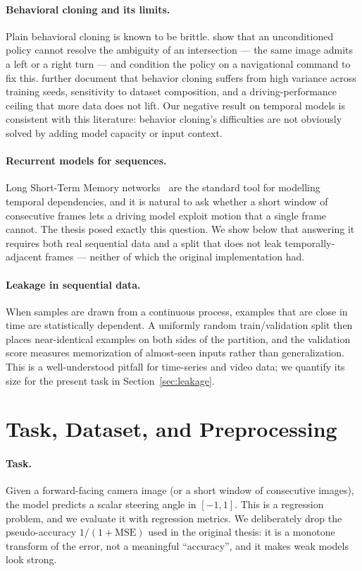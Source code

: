 \documentclass[11pt]{article}
\begin{document}
\paragraph{Behavioral cloning and its limits.}
Plain behavioral cloning is known to be brittle. \mbox{\citet{codevilla2018end}} show that
an unconditioned policy cannot resolve the ambiguity of an intersection --- the same
image admits a left or a right turn --- and condition the policy on a navigational
command to fix this. \mbox{\citet{codevilla2019exploring}} further document that behavior
cloning suffers from high variance across training seeds, sensitivity to dataset
composition, and a driving-performance ceiling that more data does not lift. Our
negative result on temporal models is consistent with this literature: behavior
cloning's difficulties are not obviously solved by adding model capacity or input
context.

\paragraph{Recurrent models for sequences.}
Long Short-Term Memory networks~\mbox{\citep{hochreiter1997long}} are the standard tool for
modelling temporal dependencies, and it is natural to ask whether a short window of
consecutive frames lets a driving model exploit motion that a single frame cannot.
The thesis posed exactly this question. We show below that answering it requires
both real sequential data and a split that does not leak temporally-adjacent frames
--- neither of which the original implementation had.

\paragraph{Leakage in sequential data.}
When samples are drawn from a continuous process, examples that are close in time
are statistically dependent. A uniformly random train/validation split then places
near-identical examples on both sides of the partition, and the validation score
measures memorization of almost-seen inputs rather than generalization. This is a
well-understood pitfall for time-series and video data; we quantify its size for the
present task in Section~\ref{sec:leakage}.

\section{Task, Dataset, and Preprocessing}

\paragraph{Task.}
Given a forward-facing camera image (or a short window of consecutive images), the
model predicts a scalar steering angle in $[-1, 1]$. This is a regression problem,
and we evaluate it with regression metrics. We deliberately drop the pseudo-accuracy
$1/(1+\mathrm{MSE})$ used in the original thesis: it is a monotone transform of the
error, not a meaningful ``accuracy'', and it makes weak models look strong.
\end{document}
